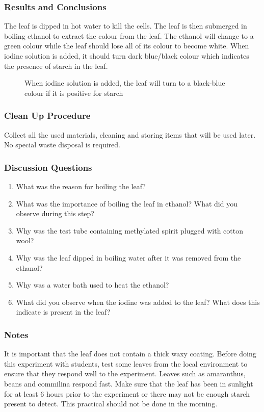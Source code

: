 \subsubsection*{Results and Conclusions}
The leaf is dipped in hot water to kill the cells. The leaf is then submerged in boiling ethanol to extract the colour from the leaf. The ethanol will change to a green colour while the leaf should lose all of its colour to become white. When iodine solution is added, it should turn dark blue/black colour which indicates the presence of starch in the leaf.

\begin{figure}[h]
\begin{center}
\def\svgwidth{6cm}

\caption{When iodine solution is added, the leaf will turn to a black-blue colour if it is positive for starch}
\label{fig:starch}
\end{center}
\end{figure}

\subsubsection*{Clean Up Procedure}
Collect all the used materials, cleaning and storing items that will be used later. No special waste disposal is required.

\subsubsection*{Discussion Questions}
\begin{enumerate}
\item{What was the reason for boiling the leaf?}
\item{What was the importance of boiling the leaf in ethanol? What did you observe during this step?}
\item{Why was the test tube containing methylated spirit plugged with cotton wool?}
\item{Why was the leaf dipped in boiling water after it was removed from the ethanol?}
\item{Why was a water bath used to heat the ethanol?}
\item{What did you observe when the iodine was added to the leaf? What does this indicate is present in the leaf?}
\end{enumerate}

\subsubsection*{Notes}
It is important that the leaf does not contain a thick waxy coating. Before doing this experiment with students, test some leaves from the local environment to ensure that they respond well to the experiment. Leaves such as amaranthus, beans and commilina respond fast. Make sure that the leaf has been in sunlight for at least 6 hours prior to the experiment or there may not be enough starch present to detect. This practical should not be done in the morning.

